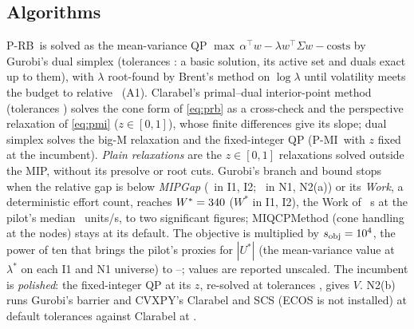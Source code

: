 \documentclass[conference]{IEEEtran}
\newcommand{\T}{^{\top}}
\newcommand{\pmi}{\mbox{P-MI}}
\newcommand{\prb}{\mbox{P-RB}}
\begin{document}
\subsection{Algorithms}
\prb\ is solved as the mean-variance QP $\max\,\alpha\T w-\lambda w\T\Sigma w-\text{costs}$ by Gurobi's dual simplex (tolerances \QPTol: a basic solution, its active set and duals exact up to them), with $\lambda$ root-found by Brent's method on $\log\lambda$ until volatility meets the budget to relative \RootRtol\ (A1). Clarabel's primal--dual interior-point method \cite{goulart2024clarabel} (tolerances \ClarabelTol) solves the cone form of \eqref{eq:prb} as a cross-check and the perspective relaxation of \eqref{eq:pmi} ($z\in[0,1]$), whose finite differences give its slope; dual simplex solves the big-M relaxation and the fixed-integer QP (\pmi\ with $z$ fixed at the incumbent). \emph{Plain relaxations} are the $z\in[0,1]$ relaxations solved outside the MIP, without its presolve or root cuts. Gurobi's branch and bound \cite{gurobi2026manual} stops when the relative gap is below \emph{MIPGap} (\IOneMipGap\ in I1, I2; \NOneMipGap\ in N1, N2(a)) or its \emph{Work}, a deterministic effort count, reaches $W^*=340$ (\IOneWorkFactor$W^*$ in I1, I2), the Work of \WStarSeconds~s at the pilot's median \WorkRateMed\ units/s, to two significant figures; MIQCPMethod (cone handling at the nodes) stays at its default. The objective is multiplied by $s_{\mathrm{obj}}=10^{4}$, the power of ten that brings the pilot's proxies for $|U^*|$ (the mean-variance value at $\lambda^*$ on each I1 and N1 universe) to \SObjProxyMin--\SObjProxyMax; values are reported unscaled. The incumbent is \emph{polished}: the fixed-integer QP at its $z$, re-solved at tolerances \PolishTol, gives $V$. N2(b) runs Gurobi's barrier and CVXPY's \cite{diamond2016cvxpy} Clarabel and SCS (ECOS is not installed) at default tolerances against Clarabel at \NTwoRefTol.

\end{document}
